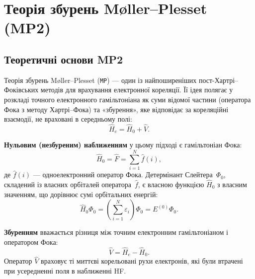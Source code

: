 
\vspace*{0.5em}
\section{Теорія збурень Møller–Plesset (MP2)}

\subsection{Теоретичні основи MP2}

Теорія збурень Møller–Plesset (\texttt{MP}) --- один із найпоширеніших
пост-Хартрі–Фоківських методів для врахування електронної кореляції.
Її ідея полягає у розкладі точного електронного гамільтоніана
як суми відомої частини (оператора Фока з методу Хартрі–Фока)
та «збурення», яке відповідає за кореляційні взаємодії,
не враховані в середньому полі:
\begin{equation}
    \hat{H}_e = \hat{H}_0 + \hat{V}.
\end{equation}

\textbf{Нульовим (незбуреним) наближенням} у цьому підході є гамільтоніан Фока:
\[
    \hat{H}_0 = \hat{F} = \sum_{i=1}^{N} \hat{f}(i),
\]
де \(\hat{f}(i)\) --- одноелектронний оператор Фока. Детермінант Слейтера~\(\Phi_0\),
складений із власних орбіталей оператора~\(\hat{f}\), є власною функцією \(\hat{H}_0\)
з власним значенням, що дорівнює сумі орбітальних енергій:
\[
    \hat{H}_0 \Phi_0 = \left(\sum_{i=1}^{N} \varepsilon_i\right) \Phi_0 = E^{(0)} \Phi_0.
\]

\textbf{Збуренням} вважається різниця між точним електронним гамільтоніаном і оператором Фока:
\[
    \hat{V} = \hat{H}_e - \hat{H}_0.
\]
Оператор \(\hat{V}\) враховує ті миттєві корельовані рухи електронів,
які були втрачені при усередненні поля в наближенні HF.

